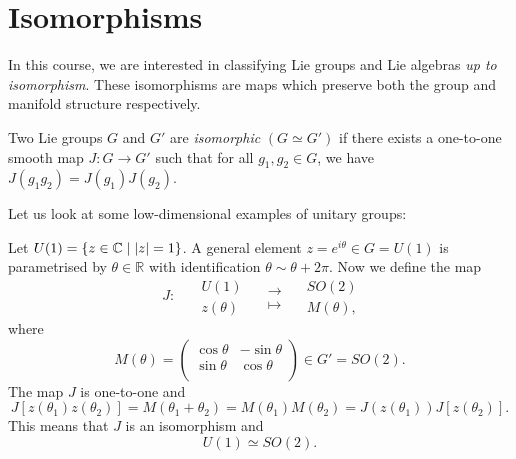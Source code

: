 
\section{Isomorphisms}%
\label{sec:isomorphisms}

In this course, we are interested in classifying Lie groups and Lie algebras \emph{up to isomorphism}. These isomorphisms are maps which preserve both the group and manifold structure respectively.

\begin{definition}[isomorphism]
  Two Lie groups $G$ and $G'$ are \emph{isomorphic} $(G \simeq G')$ if there exists a one-to-one smooth map $J : G \to G'$ such that for all $g_1, g_2 \in G$, we have $J(g_1 g_2) = J(g_1) J(g_2)$.
\end{definition}

Let us look at some low-dimensional examples of unitary groups:
\begin{example}[$G = U(1)$]
  Let $U(1) = \left\{ z \in \mathbb{C} \mid \abs{z} = 1 \right\}$. A general element $z = e^{i \theta} \in G = U(1)$ is parametrised by $\theta \in \mathbb{R}$ with identification $\theta \sim \theta + 2\pi$. Now we define the map
  \begin{equation}
    \begin{gathered}
      J \colon \\
      \qquad
    \end{gathered}
    \begin{gathered}
      U(1) \\
      z(\theta)
    \end{gathered}
    \quad
    \begin{gathered}
      \to \\
      \mapsto
    \end{gathered}
    \quad
    \begin{gathered}
      SO(2) \\
      M(\theta),
    \end{gathered}
  \end{equation}
  where
  \begin{equation}
    M(\theta) =
    \begin{pmatrix}
     \cos\theta & -\sin\theta \\
     \sin\theta & \cos\theta \\
   \end{pmatrix} \in G' = SO(2).
  \end{equation}
  The map $J$ is one-to-one and
  \begin{equation}
    J[z(\theta_1) z(\theta_2)] = M(\theta_1 + \theta_2) = M(\theta_1) M(\theta_2) = J(z(\theta_1)) J[z(\theta_2)].
  \end{equation}
  This means that $J$ is an isomorphism and
  \begin{equation}
    U(1) \simeq SO(2).
  \end{equation}
\end{example}

